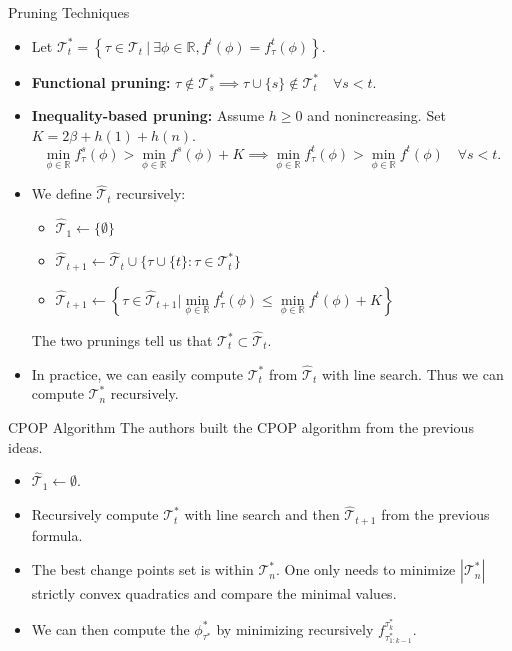 \documentclass[10pt, xcolor=dvipsnames]{beamer}
\begin{document}
\begin{frame}{Pruning Techniques}
\begin{itemize}
    \item Let $\mathcal{T}_t^*=\left\{\tau\in \mathcal{T}_t \:\big|\: \exists\phi\in\mathbb{R}, f^t(\phi)=f_{\tau}^t(\phi)\right\}$. 
    \item \textbf{Functional pruning:} 
    $
    \tau \notin \mathcal{T}_s ^* \implies \tau \cup \{s\} \notin \mathcal{T}_t ^* \quad \forall s < t. 
    $
    \item \textbf{Inequality-based pruning:} Assume $h \geq 0$ and nonincreasing. Set $K=2\beta + h(1) + h(n)$.
    $$ \min\limits_{\phi \in \mathbb{R}} f_{\tau}^s(\phi) > \min_{\phi \in \mathbb{R}} f^s(\phi) + K 
    \implies  \min\limits_{\phi \in \mathbb{R}} f_{\tau}^t(\phi) > \min_{\phi \in \mathbb{R}} f^t(\phi) \quad \forall s<t.
    $$
    \item We define $\hat{\mathcal{T}}_t$ recursively:
        \begin{itemize}
        \item $\hat{\mathcal{T}}_1 \leftarrow \{\emptyset\}$
        \vspace{0.5}
        \item $\hat{\mathcal{T}}_{t+1} \leftarrow \hat{\mathcal{T}}_t \cup \{\tau \cup \{t\} : \tau \in \mathcal{T}_t^* \}$
        \vspace{0.5}
        \item $\hat{\mathcal{T}}_{t+1} \leftarrow \left\{ \tau \in \hat{\mathcal{T}}_{t+1} \bigg| \min\limits_{\phi \in \mathbb{R}} f_{\tau}^t(\phi) \leq \min\limits_{\phi \in \mathbb{R}} f^t(\phi) + K \right\}$
        \end{itemize}

    The two prunings tell us that $\mathcal{T}_t ^* \subset \hat{\mathcal{T}}_t$.

    \item In practice, we can easily compute $\mathcal{T}_t^*$ from $\hat{\mathcal{T}}_t$ with line search. Thus we can compute $\mathcal{T}_n ^*$ recursively. 
\end{itemize}
\end{frame}


\begin{frame}{CPOP Algorithm}
The authors built the CPOP algorithm from the previous ideas. 
\begin{itemize}
    \item $\hat{\mathcal{T}}_1 \leftarrow \emptyset$.
    \item Recursively compute $\mathcal{T}_t^*$ with line search and then $\hat{\mathcal{T}}_{t+1}$ from the previous formula. 
    \item The best change points set is within $\mathcal{T}_n^*$. One only needs to minimize $| \mathcal{T}_n^* |$ strictly convex quadratics and compare the minimal values.
    \item We can then compute the $\phi_{\tau^*}^*$ by minimizing recursively $f_{\tau^*_{1:k-1}}^{\tau_k ^*}$.
\end{itemize}
\end{frame}
\end{document}
